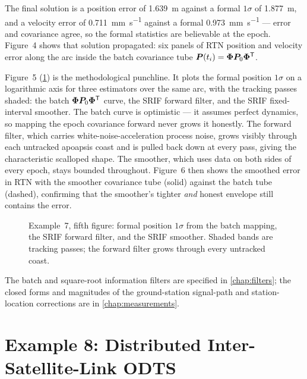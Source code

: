 The final solution is a position error of \SI{1.639}{\meter} against a formal
$1\sigma$ of \SI{1.877}{\meter}, and a velocity error of
\SI{0.711}{\milli\meter\per\second} against a formal
\SI{0.973}{\milli\meter\per\second} --- error and covariance agree, so the
formal statistics are believable at the epoch. Figure~4 shows that solution
propagated: six panels of RTN position and velocity error along the arc inside
the batch covariance tube $\bm{P}(t_i)=\bm{\Phi}\bm{P}_0\bm{\Phi}^{\mathsf{T}}$.

Figure~5 (\cref{fig:tut-ex7-srif}) is the methodological punchline. It plots
the formal position $1\sigma$ on a logarithmic axis for three estimators over
the same arc, with the tracking passes shaded: the batch
$\bm{\Phi}\bm{P}_0\bm{\Phi}^{\mathsf{T}}$ curve, the SRIF forward filter, and the
SRIF fixed-interval smoother. The batch curve is optimistic --- it assumes
perfect dynamics, so mapping the epoch covariance forward never grows it
honestly. The forward filter, which carries white-noise-acceleration process
noise, grows visibly through each untracked apoapsis coast and is pulled back
down at every pass, giving the characteristic scalloped shape. The smoother,
which uses data on both sides of every epoch, stays bounded throughout. Figure~6
then shows the smoothed error in RTN with the smoother covariance tube (solid)
against the batch tube (dashed), confirming that the smoother's tighter
\emph{and} honest envelope still contains the error.

\begin{figure}[htbp]
  \centering
  \caption{Example~7, fifth figure: formal position $1\sigma$ from the batch
           mapping, the SRIF forward filter, and the SRIF smoother. Shaded
           bands are tracking passes; the forward filter grows through every
           untracked coast.}
  \label{fig:tut-ex7-srif}
\end{figure}

The batch and square-root information filters are specified in
\cref{chap:filters}; the closed forms and magnitudes of the ground-station
signal-path and station-location corrections are in \cref{chap:measurements}.

\section{Example 8: Distributed Inter-Satellite-Link ODTS}
\label{sec:tut-ex8}

